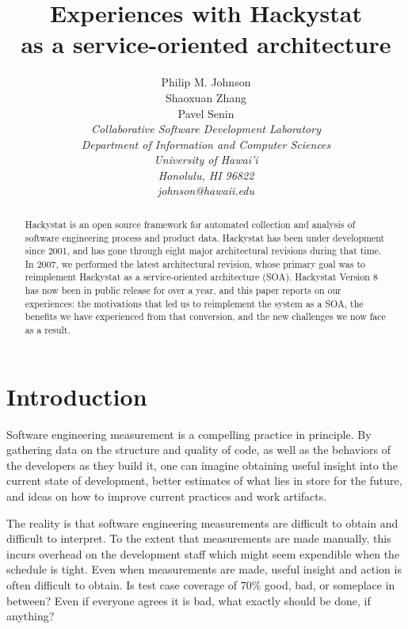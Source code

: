 \documentclass[conference,compsoc,peerreview]{IEEEtran}
\begin{document}
\title{Experiences with Hackystat \\ as a service-oriented architecture}

\author{Philip M. Johnson \\
        Shaoxuan Zhang \\
        Pavel Senin \\
\em  Collaborative Software Development Laboratory \\
      Department of Information and Computer Sciences \\
      University of Hawai'i \\
      Honolulu, HI 96822 \\
      johnson@hawaii.edu \\
}


\maketitle
\IEEEpeerreviewmaketitle

\begin{abstract}  %
Hackystat is an open source framework for automated collection and analysis
of software engineering process and product data.  Hackystat has been under
development since 2001, and has gone through eight major architectural
revisions during that time.  In 2007, we performed the latest architectural
revision, whose primary goal was to reimplement Hackystat as a
service-oriented architecture (SOA).  Hackystat Version 8 has now been in
public release for over a year, and this paper reports on our experiences:
the motivations that led us to reimplement the system as a SOA, the
benefits we have experienced from that conversion, and the new challenges
we now face as a result.
\end{abstract}


\section{Introduction}
\label{sec:intro}

Software engineering measurement is a compelling practice in principle. By
gathering data on the structure and quality of code, as well as the
behaviors of the developers as they build it, one can imagine obtaining
useful insight into the current state of development, better estimates of
what lies in store for the future, and ideas on how to improve current
practices and work artifacts.

The reality is that software engineering measurements are difficult to
obtain and difficult to interpret. To the extent that measurements are made
manually, this incurs overhead on the development staff which might seem
expendible when the schedule is tight.  Even when measurements are made,
useful insight and action is often difficult to obtain.  Is test case coverage of 70\%
good, bad, or someplace in between? Even if everyone agrees it is bad, what
exactly should be done, if anything?
\end{document}

